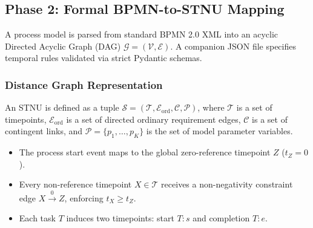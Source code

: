 \documentclass[conference]{IEEEtran}
\begin{document}
\subsection{Phase 2: Formal BPMN-to-STNU Mapping}
A process model is parsed from standard BPMN 2.0 XML into an acyclic Directed Acyclic Graph (DAG) $\mathcal{G} = (\mathcal{V}, \mathcal{E})$. A companion JSON file specifies temporal rules validated via strict Pydantic schemas.

\subsubsection{Distance Graph Representation}
An STNU is defined as a tuple $\mathcal{S} = (\mathcal{T}, \mathcal{E}_{\text{ord}}, \mathcal{C}, \mathcal{P})$, where $\mathcal{T}$ is a set of timepoints, $\mathcal{E}_{\text{ord}}$ is a set of directed ordinary requirement edges, $\mathcal{C}$ is a set of contingent links, and $\mathcal{P} = \{p_1, \dots, p_K\}$ is the set of model parameter variables.
\begin{itemize}
    \item The process start event maps to the global zero-reference timepoint $Z$ ($t_Z = 0$).
    \item Every non-reference timepoint $X \in \mathcal{T}$ receives a non-negativity constraint edge $X \xrightarrow{0} Z$, enforcing $t_X \geq t_Z$.
    \item Each task $T$ induces two timepoints: start $T{:}s$ and completion $T{:}e$.
\end{itemize}

\begin{table}[h]
\centering
\caption{BPMN Element to STNU Distance-Graph Mapping}
\label{tab:mapping}
\end{table}
\end{document}
